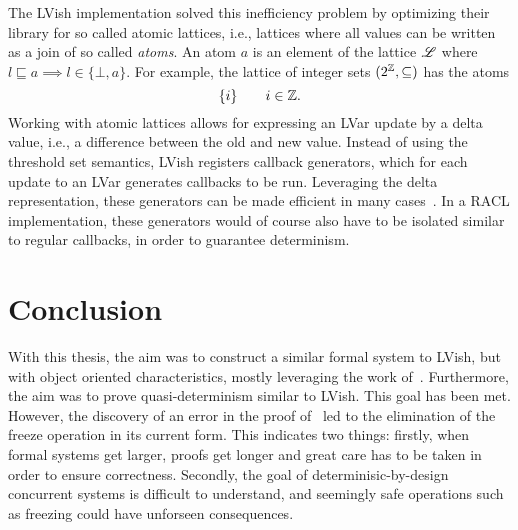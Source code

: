 The LVish implementation solved this inefficiency problem by optimizing their
library for so called atomic lattices, i.e., lattices where all values can be
written as a join of so called \emph{atoms}. An atom $a$ is an element of the
lattice $\mbox{$\mathscr{L}$}$ where $l \sqsubseteq a \implies l \in \{\bot, a\}$. For
example, the lattice of integer sets $(2^{\mathbb{Z}}, \subseteq)$ has the atoms
\begin{equation*}
  \{ i \} \quad\quad i \in \mathbb{Z}.
\end{equation*}
Working with atomic lattices allows for expressing an LVar update by a delta
value, i.e., a difference between the old and new value. Instead of using the
threshold set semantics, LVish registers callback generators, which for each
update to an LVar generates callbacks to be run. Leveraging the delta
representation, these generators can be made efficient in many
cases~\parencite{kuper2014freeze}. In a RACL implementation, these generators
would of course also have to be isolated similar to regular callbacks, in
order to guarantee determinism.


\section{Conclusion}%
\label{sec:conclusion}

With this thesis, the aim was to construct a similar formal system to LVish, but
with object oriented characteristics, mostly leveraging the work
of~\textcite{conf/oopsla/HallerL16}. Furthermore, the aim was to prove
quasi-determinism similar to LVish. This goal has been met.  However, the
discovery of an error in the proof of~\textcite{kuper2014freezeTR} led to the
elimination of the freeze operation in its current form. This indicates two
things: firstly, when formal systems get larger, proofs get longer and great
care has to be taken in order to ensure correctness. Secondly, the goal of
determinisic-by-design concurrent systems is difficult to understand, and
seemingly safe operations such as freezing could have unforseen consequences.





